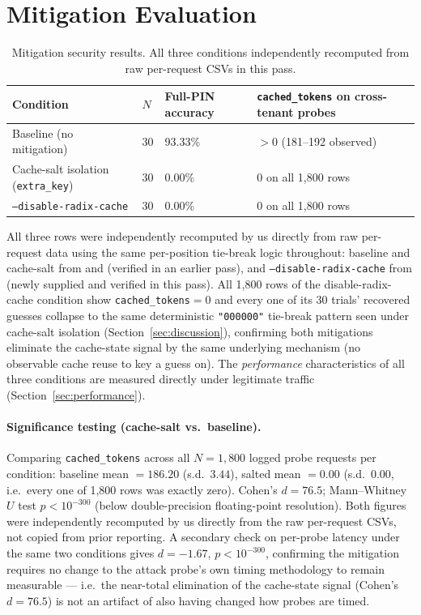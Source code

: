 \documentclass[11pt]{article}
\begin{document}
\section{Mitigation Evaluation}
\label{sec:mitigation-eval}
\begin{table}[h]
\centering
\caption{Mitigation security results. All three conditions independently recomputed from raw per-request CSVs in this pass.}
\begin{tabular}{@{}llll@{}}
\toprule
Condition & $N$ & Full-PIN accuracy & \texttt{cached\_tokens} on cross-tenant probes \\
\midrule
Baseline (no mitigation) & 30 & 93.33\% & $>0$ (181--192 observed) \\
Cache-salt isolation (\texttt{extra\_key}) & 30 & 0.00\% & 0 on all 1{,}800 rows \\
\texttt{--disable-radix-cache} & 30 & 0.00\% & 0 on all 1{,}800 rows \\
\bottomrule
\end{tabular}
\end{table}
\noindent All three rows were independently recomputed by us directly
from raw per-request data using the same per-position tie-break logic
throughout: baseline and cache-salt from
{\ttfamily{}} and
{\ttfamily{}} (verified in an
earlier pass), and \texttt{--disable-radix-cache} from
{\ttfamily{}} (newly
supplied and verified in this pass). All 1,800 rows of the
disable-radix-cache condition show \texttt{cached\_tokens}$=0$ and every
one of its 30 trials' recovered guesses collapse to the same
deterministic \texttt{"000000"} tie-break pattern seen under cache-salt
isolation (Section~\ref{sec:discussion}), confirming both mitigations
eliminate the cache-state signal by the same underlying mechanism (no
observable cache reuse to key a guess on). The \emph{performance}
characteristics of all three conditions are measured directly under
legitimate traffic (Section~\ref{sec:performance}).

\paragraph{Significance testing (cache-salt vs.\ baseline).} Comparing
\texttt{cached\_tokens} across all $N{=}1{,}800$ logged probe requests
per condition: baseline mean $=186.20$ (s.d.\ $3.44$), salted mean
$=0.00$ (s.d.\ $0.00$, i.e.\ every one of 1,800 rows was exactly zero).
Cohen's $d = 76.5$; Mann--Whitney $U$ test $p < 10^{-300}$ (below
double-precision floating-point resolution). Both figures were
independently recomputed by us directly from the raw per-request CSVs,
not copied from prior reporting. A secondary check on per-probe latency
under the same two conditions gives $d=-1.67$, $p<10^{-300}$, confirming
the mitigation requires no change to the attack probe's own timing
methodology to remain measurable --- i.e.\ the near-total elimination of
the cache-state signal (Cohen's $d=76.5$) is not an artifact of also
having changed how probes are timed.
\end{document}
